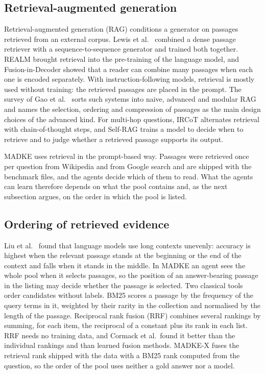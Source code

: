 \subsection{Retrieval-augmented generation}
Retrieval-augmented generation (RAG) conditions a generator on passages retrieved from an external corpus. Lewis et al.~\cite{lewis2020rag} combined a dense passage retriever \cite{karpukhin2020dpr} with a sequence-to-sequence generator and trained both together. REALM \cite{guu2020realm} brought retrieval into the pre-training of the language model, and Fusion-in-Decoder \cite{izacard2021fid} showed that a reader can combine many passages when each one is encoded separately. With instruction-following models, retrieval is mostly used without training: the retrieved passages are placed in the prompt. The survey of Gao et al.~\cite{gao2023ragsurvey} sorts such systems into naive, advanced and modular RAG and names the selection, ordering and compression of passages as the main design choices of the advanced kind. For multi-hop questions, IRCoT \cite{trivedi2023ircot} alternates retrieval with chain-of-thought steps, and Self-RAG \cite{asai2024selfrag} trains a model to decide when to retrieve and to judge whether a retrieved passage supports its output.

MADKE uses retrieval in the prompt-based way. Passages were retrieved once per question from Wikipedia and from Google search and are shipped with the benchmark files, and the agents decide which of them to read. What the agents can learn therefore depends on what the pool contains and, as the next subsection argues, on the order in which the pool is listed.

\subsection{Ordering of retrieved evidence}
Liu et al.~\cite{liu2024lost} found that language models use long contexts unevenly: accuracy is highest when the relevant passage stands at the beginning or the end of the context and falls when it stands in the middle. In MADKE an agent sees the whole pool when it selects passages, so the position of an answer-bearing passage in the listing may decide whether the passage is selected. Two classical tools order candidates without labels. BM25 \cite{robertson2009bm25} scores a passage by the frequency of the query terms in it, weighted by their rarity in the collection and normalised by the length of the passage. Reciprocal rank fusion (RRF) \cite{cormack2009rrf} combines several rankings by summing, for each item, the reciprocal of a constant plus its rank in each list. RRF needs no training data, and Cormack et al.\ found it better than the individual rankings and than learned fusion methods. MADKE-X fuses the retrieval rank shipped with the data with a BM25 rank computed from the question, so the order of the pool uses neither a gold answer nor a model.

